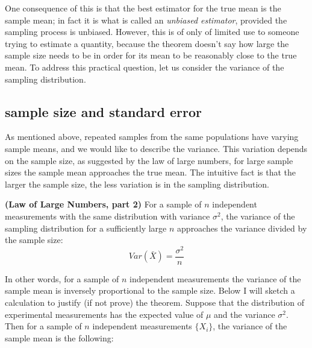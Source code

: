 \documentclass[
  letterpaper,
  DIV=11,
  numbers=noendperiod]{scrreprt}
\begin{document}
One consequence of this is that the best estimator for the true mean is
the sample mean; in fact it is what is called an \emph{unbiased
estimator}, provided the sampling process is unbiased. However, this is
of only of limited use to someone trying to estimate a quantity, because
the theorem doesn't say how large the sample size needs to be in order
for its mean to be reasonably close to the true mean. To address this
practical question, let us consider the variance of the sampling
distribution.

\hypertarget{sample-size-and-standard-error}{%
\subsection{sample size and standard
error}\label{sample-size-and-standard-error}}

As mentioned above, repeated samples from the same populations have
varying sample means, and we would like to describe the variance. This
variation depends on the sample size, as suggested by the law of large
numbers, for large sample sizes the sample mean approaches the true
mean. The intuitive fact is that the larger the sample size, the less
variation is in the sampling distribution.

\begin{tcolorbox}[enhanced jigsaw, coltitle=black, arc=.35mm, opacitybacktitle=0.6, breakable, bottomtitle=1mm, toptitle=1mm, titlerule=0mm, colback=white, leftrule=.75mm, rightrule=.15mm, colframe=quarto-callout-important-color-frame, colbacktitle=quarto-callout-important-color!10!white, opacityback=0, title=\textcolor{quarto-callout-important-color}{\faExclamation}\hspace{0.5em}{Theorem}, left=2mm, toprule=.15mm, bottomrule=.15mm]

\textbf{(Law of Large Numbers, part 2)} For a sample of \(n\)
independent measurements with the same distribution with variance
\(\sigma^2\), the variance of the sampling distribution for a
sufficiently large \(n\) approaches the variance divided by the sample
size: \[ Var(\bar X) = \frac{\sigma^2}{n}\]

\end{tcolorbox}

In other words, for a sample of \(n\) independent measurements the
variance of the sample mean is inversely proportional to the sample
size. Below I will sketch a calculation to justify (if not prove) the
theorem. Suppose that the distribution of experimental measurements has
the expected value of \(\mu\) and the variance \(\sigma^2\). Then for a
sample of \(n\) independent measurements \(\{X_i\}\), the variance of
the sample mean is the following:
\end{document}
